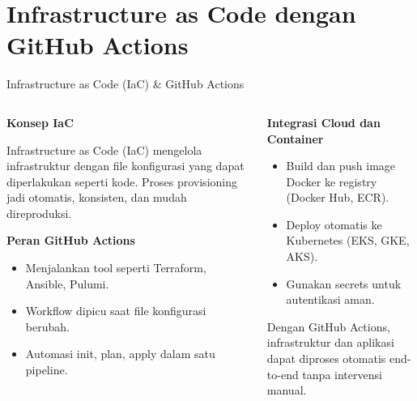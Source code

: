 \documentclass[aspectratio=169, table]{beamer}
\begin{document}
\section{Infrastructure as Code dengan GitHub Actions}

\begin{frame}[fragile]{Infrastructure as Code (IaC) \& GitHub Actions}
	\vspace{20pt}
	
	\begin{columns}[T]
		\begin{column}{0.6\textwidth}
			\textbf{Konsep IaC}
			
			Infrastructure as Code (IaC) mengelola infrastruktur dengan file konfigurasi yang dapat diperlakukan seperti kode. Proses provisioning jadi otomatis, konsisten, dan mudah direproduksi.
			
			\vspace{6pt}
			\textbf{Peran GitHub Actions}
			\begin{itemize}
				\item Menjalankan tool seperti Terraform, Ansible, Pulumi.
				\item Workflow dipicu saat file konfigurasi berubah.
				\item Automasi init, plan, apply dalam satu pipeline.
			\end{itemize}
		\end{column}
		
		\begin{column}{0.4\textwidth}
			\textbf{Integrasi Cloud dan Container}
			\begin{itemize}
				\item Build dan push image Docker ke registry (Docker Hub, ECR).
				\item Deploy otomatis ke Kubernetes (EKS, GKE, AKS).
				\item Gunakan secrets untuk autentikasi aman.
			\end{itemize}
			
			\vspace{8pt}
			Dengan GitHub Actions, infrastruktur dan aplikasi dapat diproses otomatis end-to-end tanpa intervensi manual.
		\end{column}
	\end{columns}
\end{frame}
\end{document}
